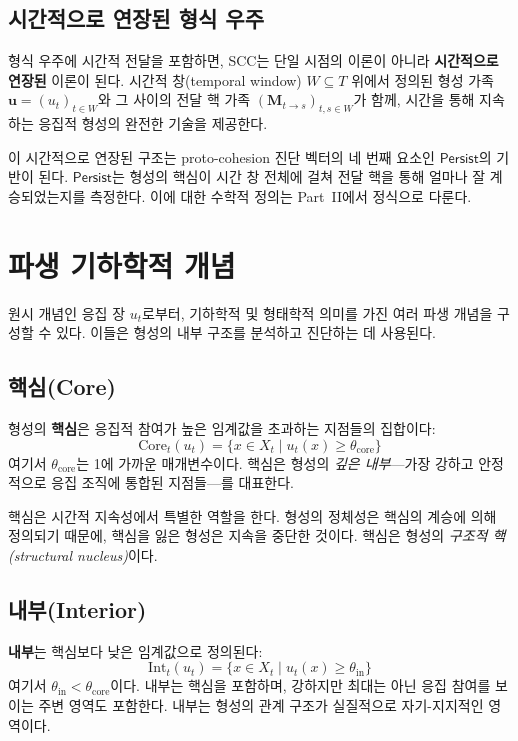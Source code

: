 \subsection{시간적으로 연장된 형식 우주}

형식 우주에 시간적 전달을 포함하면, SCC는 단일 시점의 이론이 아니라 \textbf{시간적으로 연장된} 이론이 된다. 시간적 창(temporal window) $W \subseteq T$ 위에서 정의된 형성 가족 $\mathbf{u} = (u_t)_{t \in W}$와 그 사이의 전달 핵 가족 $(\mathbf{M}_{t \to s})_{t, s \in W}$가 함께, 시간을 통해 지속하는 응집적 형성의 완전한 기술을 제공한다.

이 시간적으로 연장된 구조는 proto-cohesion 진단 벡터의 네 번째 요소인 $\mathsf{Persist}$의 기반이 된다. $\mathsf{Persist}$는 형성의 핵심이 시간 창 전체에 걸쳐 전달 핵을 통해 얼마나 잘 계승되었는지를 측정한다. 이에 대한 수학적 정의는 Part~II에서 정식으로 다룬다.


\section{파생 기하학적 개념}
\label{sec:derived-geometric}

원시 개념인 응집 장 $u_t$로부터, 기하학적 및 형태학적 의미를 가진 여러 파생 개념을 구성할 수 있다. 이들은 형성의 내부 구조를 분석하고 진단하는 데 사용된다.


\subsection{핵심(Core)}

형성의 \textbf{핵심}은 응집적 참여가 높은 임계값을 초과하는 지점들의 집합이다:
\begin{equation}
    \mathrm{Core}_t(u_t) = \{x \in X_t \mid u_t(x) \geq \theta_{\mathrm{core}}\}
    \label{eq:core-def}
\end{equation}
여기서 $\theta_{\mathrm{core}}$는 1에 가까운 매개변수이다. 핵심은 형성의 \emph{깊은 내부}---가장 강하고 안정적으로 응집 조직에 통합된 지점들---를 대표한다.

핵심은 시간적 지속성에서 특별한 역할을 한다. 형성의 정체성은 핵심의 계승에 의해 정의되기 때문에, 핵심을 잃은 형성은 지속을 중단한 것이다. 핵심은 형성의 \emph{구조적 핵(structural nucleus)}이다.


\subsection{내부(Interior)}

\textbf{내부}는 핵심보다 낮은 임계값으로 정의된다:
\begin{equation}
    \mathrm{Int}_t(u_t) = \{x \in X_t \mid u_t(x) \geq \theta_{\mathrm{in}}\}
    \label{eq:interior-def}
\end{equation}
여기서 $\theta_{\mathrm{in}} < \theta_{\mathrm{core}}$이다. 내부는 핵심을 포함하며, 강하지만 최대는 아닌 응집 참여를 보이는 주변 영역도 포함한다. 내부는 형성의 관계 구조가 실질적으로 자기-지지적인 영역이다.


